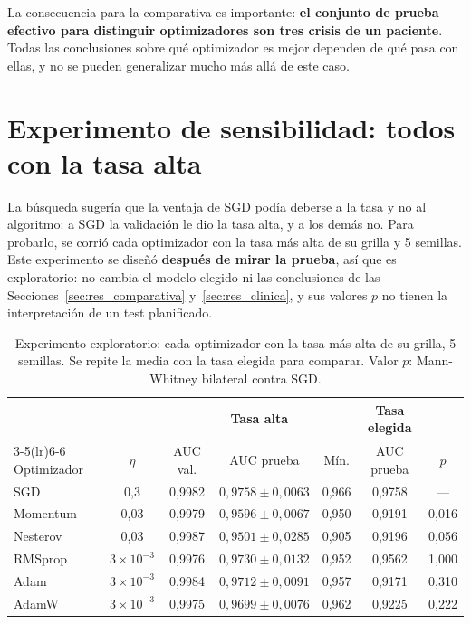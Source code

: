 La consecuencia para la comparativa es importante: \textbf{el conjunto de prueba efectivo para distinguir optimizadores son
tres crisis de un paciente}. Todas las conclusiones sobre qué optimizador es mejor dependen de qué pasa con ellas, y no se
pueden generalizar mucho más allá de este caso.

\section{Experimento de sensibilidad: todos con la tasa alta}
\label{sec:res_tasa_alta}

La búsqueda sugería que la ventaja de SGD podía deberse a la tasa y no al algoritmo: a SGD la validación le dio la tasa
alta, y a los demás no. Para probarlo, se corrió cada optimizador con la tasa más alta de su grilla y 5 semillas. Este
experimento se diseñó \textbf{después de mirar la prueba}, así que es exploratorio: no cambia el modelo elegido ni las
conclusiones de las Secciones~\ref{sec:res_comparativa} y~\ref{sec:res_clinica}, y sus valores $p$ no tienen la
interpretación de un test planificado.

\begin{table}[ht]
\centering
\caption{Experimento exploratorio: cada optimizador con la tasa más alta de su grilla, 5 semillas. Se repite la media con la
tasa elegida para comparar. Valor $p$: Mann-Whitney bilateral contra SGD.}
\label{tab:tasa_alta}
\begin{tabular}{lcccccc}
\toprule
 & & \multicolumn{3}{c}{Tasa alta} & Tasa elegida & \\
\cmidrule(lr){3-5}\cmidrule(lr){6-6}
Optimizador & $\eta$ & AUC val. & AUC prueba & Mín. & AUC prueba & $p$ \\
\midrule
SGD      & 0,3              & 0,9982 & $0{,}9758 \pm 0{,}0063$ & 0,966 & 0,9758 & --- \\
Momentum & 0,03             & 0,9979 & $0{,}9596 \pm 0{,}0067$ & 0,950 & 0,9191 & 0,016 \\
Nesterov & 0,03             & 0,9987 & $0{,}9501 \pm 0{,}0285$ & 0,905 & 0,9196 & 0,056 \\
RMSprop  & $3\times10^{-3}$ & 0,9976 & $0{,}9730 \pm 0{,}0132$ & 0,952 & 0,9562 & 1,000 \\
Adam     & $3\times10^{-3}$ & 0,9984 & $0{,}9712 \pm 0{,}0091$ & 0,957 & 0,9171 & 0,310 \\
AdamW    & $3\times10^{-3}$ & 0,9975 & $0{,}9699 \pm 0{,}0076$ & 0,962 & 0,9225 & 0,222 \\
\bottomrule
\end{tabular}
\end{table}

